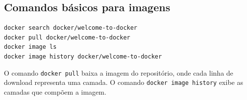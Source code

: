 \subsection{Comandos básicos para imagens}

\begin{verbatim}
docker search docker/welcome-to-docker
docker pull docker/welcome-to-docker
docker image ls
docker image history docker/welcome-to-docker
\end{verbatim}

O comando \texttt{docker pull} baixa a imagem do repositório, onde cada linha de download representa uma camada. O comando \texttt{docker image history} exibe as camadas que compõem a imagem.

